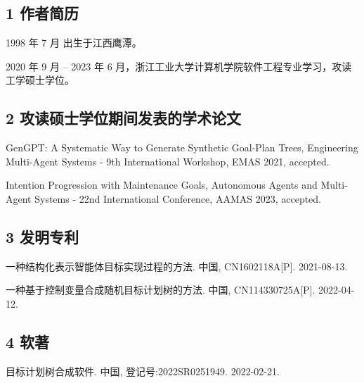 
\begin{resume}

  \subsection{1 作者简历}

  1998 年 7 月 出生于江西鹰潭。

  2020 年 9 月 -- 2023 年 6 月，浙江工业大学计算机学院软件工程专业学习，攻读工学硕士学位。

  \subsection{2 攻读硕士学位期间发表的学术论文}

  \begin{achievements}
    \item GenGPT: A Systematic Way to Generate Synthetic Goal-Plan Trees, Engineering Multi-Agent Systems - 9th International Workshop, {EMAS}
    2021, accepted.
    \item Intention Progression with Maintenance Goals, Autonomous Agents and Multi-Agent Systems - 22nd International Conference, {AAMAS}
    2023, accepted.
  \end{achievements}


  \subsection{3 发明专利}

  \begin{achievements}
    \item  一种结构化表示智能体目标实现过程的方法. 中国, CN1602118A[P]. 2021-08-13.
    \item  一种基于控制变量合成随机目标计划树的方法. 中国, CN114330725A[P]. 2022-04-12.
  \end{achievements}

  \subsection{4 软著}
  \begin{achievements}
  \item 目标计划树合成软件. 中国, 登记号:2022SR0251949. 2022-02-21.
  \end{achievements}




\end{resume}
